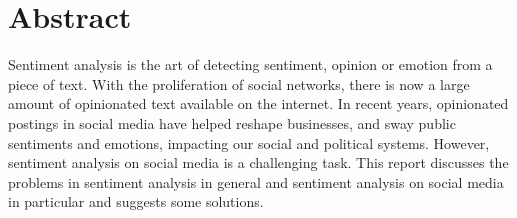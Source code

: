
\begingroup
\let\clearpage\relax
\let\cleardoublepage\relax
\let\cleardoublepage\relax

\chapter*{Abstract}
Sentiment analysis is the art of detecting sentiment, opinion or emotion from a piece of text.
With the proliferation of social networks, there is now a large amount of
opinionated text available on the internet.
In recent years, opinionated postings in social media
have helped reshape businesses, and sway public sentiments and emotions, impacting our social and political systems.
However, sentiment analysis on social media is a challenging task. 
This report discusses the problems in sentiment analysis in general and sentiment analysis on social media in particular 
and suggests some solutions.


\vfill




\endgroup			

\vfill
